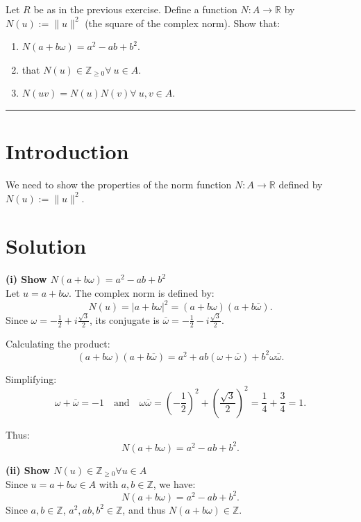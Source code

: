 \documentclass[12pt]{amsart}
\theoremstyle{definition}
\numberwithin{equation}{section}
\newcommand{\Z}{\mathbb{Z}}
\newcommand{\R}{\mathbb{R}}
\begin{document}
\newpage
\begin{exercise}{9} Let \(R \) be as in the previous exercise. Define a function \(N : A \rightarrow \R \) by \(N(u) := \| u \|^2 \) (the square of the complex norm). Show that:
    \begin{enumerate}[label=\textbf{(\roman*)}]
        \item \(N(a+b \omega )= a^2-ab+b^2\).
        \item that \(N(u)\in \Z_{\geq 0} \forall \ u \in A\).
        \item \(N(uv) = N(u)N(v) \forall \ u,v \in A\).
    \end{enumerate}

    \noindent\rule{\linewidth}{1pt}

    \section*{Introduction}
    We need to show the properties of the norm function \(N : A \rightarrow \R \) defined by \(N(u) := \| u \|^2\).

    \section*{Solution}
    \noindent \textbf{(i) Show \(N(a + b \omega) = a^2 - ab + b^2\)}\\
    Let \(u = a + b \omega \). The complex norm is defined by:
    \[
    N(u) = |a + b \omega|^2 = (a + b \omega)(a + b \overline{\omega}).
    \]
    Since \(\omega = -\frac{1}{2} + i \frac{\sqrt{3}}{2}\), its conjugate is \(\overline{\omega} = -\frac{1}{2} - i \frac{\sqrt{3}}{2}\).

    Calculating the product:
    \[
    (a + b \omega)(a + b \overline{\omega}) = a^2 + ab (\omega + \overline{\omega}) + b^2 \omega \overline{\omega}.
    \]

    Simplifying:
    \[
    \omega + \overline{\omega} = -1 \quad \text{and} \quad \omega \overline{\omega} = {\left(-\frac{1}{2}\right)}^2 + {\left(\frac{\sqrt{3}}{2}\right)}^2 = \frac{1}{4} + \frac{3}{4} = 1.
    \]

    Thus:
    \[
    N(a + b \omega) = a^2 - ab + b^2.
    \]

    \noindent \textbf{(ii) Show \(N(u) \in \Z_{\geq 0} \forall u \in A\)}\\
    Since \(u = a + b \omega \in A\) with \(a, b \in \Z \), we have:
    \[
    N(a + b \omega) = a^2 - ab + b^2.
    \]
    Since \(a, b \in \Z \), \(a^2, ab, b^2 \in \Z \), and thus \(N(a + b \omega) \in \Z \).


\end{exercise}
\end{document}
